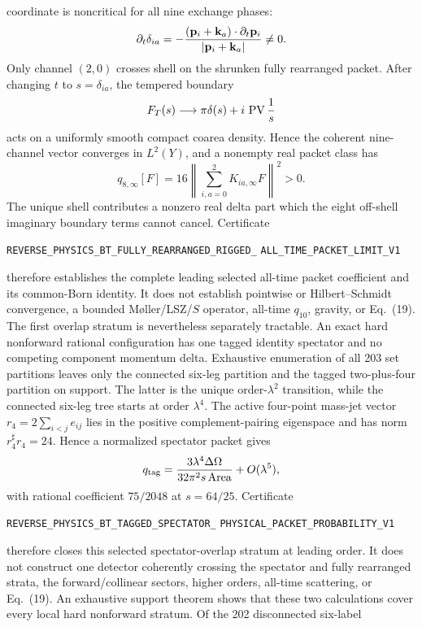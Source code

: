 \documentclass[11pt]{article}
\theoremstyle{definition}
\theoremstyle{remark}
\begin{document}
coordinate is noncritical for all nine exchange phases:
\[
 \partial_t\delta_{ia}
 =-{(\mathbf p_i+\mathbf k_a)\mathbin{\cdot}
 \partial_t\mathbf p_i\over|\mathbf p_i+\mathbf k_a|}\ne0.
\]
Only channel \((2,0)\) crosses shell on the shrunken fully rearranged packet.
After changing \(t\) to \(s=\delta_{ia}\), the tempered boundary
\[
 F_T(s)\longrightarrow
 \pi\delta(s)+i\,\operatorname{PV}{1\over s}
\]
acts on a uniformly smooth compact coarea density.  Hence the coherent
nine-channel vector converges in \(L^2(Y)\), and a nonempty real packet class
has
\[
 q_{8,\infty}[F]
 =16\left\|\sum_{i,a=0}^2K_{ia,\infty}F\right\|^2>0.
\]
The unique shell contributes a nonzero real delta part which the eight
off-shell imaginary boundary terms cannot cancel.  Certificate
\par\noindent
\texttt{REVERSE\_PHYSICS\_BT\_FULLY\_REARRANGED\_RIGGED\_}
\allowbreak\texttt{ALL\_TIME\_PACKET\_LIMIT\_V1}
\par\noindent
therefore establishes the complete leading selected all-time packet
coefficient and its common-Born identity.  It does not establish pointwise
or Hilbert--Schmidt convergence, a bounded Møller/LSZ/\(S\) operator,
all-time \(q_{10}\), gravity, or Eq.~(19).
The first overlap stratum is nevertheless separately tractable.  An exact
hard nonforward rational configuration has one tagged identity spectator and
no competing component momentum delta.  Exhaustive enumeration of all 203
set partitions leaves only the connected six-leg partition and the tagged
two-plus-four partition on support.  The latter is the unique
order-$\lambda^2$ transition, while the connected six-leg tree starts at
order $\lambda^4$.  The active four-point mass-jet vector
$r_4=2\sum_{i<j}e_{ij}$ lies in the positive complement-pairing eigenspace
and has norm $r_4^\sharp r_4=24$.  Hence a normalized spectator packet gives
\[
 q_{\rm tag}=\frac{3\lambda^4\Delta\Omega}
 {32\pi^2s\,\mathrm{Area}}+O(\lambda^5),
\]
with rational coefficient $75/2048$ at $s=64/25$.  Certificate
\par\noindent
\texttt{REVERSE\_PHYSICS\_BT\_TAGGED\_SPECTATOR\_}
\allowbreak\texttt{PHYSICAL\_PACKET\_PROBABILITY\_V1}
\par\noindent
therefore closes this selected spectator-overlap stratum at leading order.
It does not construct one detector coherently crossing the spectator and
fully rearranged strata, the forward/collinear sectors, higher orders,
all-time scattering, or Eq.~(19).
An exhaustive support theorem shows that these two calculations cover every
local hard nonforward stratum.  Of the 202 disconnected six-label
\end{document}
